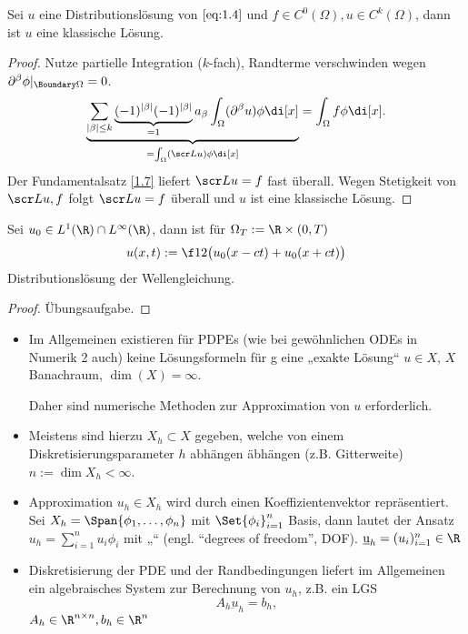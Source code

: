 \begin{st} \label{1.28}
	Sei $u$ eine Distributionslösung von $\eqref{eq:1.4}$ und $f \in C^0(\Omega), u \in C^k(\Omega)$, dann ist $u$ eine klassische Lösung.
	\begin{proof}
		Nutze partielle Integration ($k$-fach), Randterme verschwinden wegen $\partial^\beta \phi |_{\Boundary \Omega} = 0$.
		\[
			\underbrace{\sum_{|\beta|\le k} \underbrace{(-1)^{|\beta|} (-1)^{|\beta|}}_{=1} a_\beta \int_\Omega (\partial^\beta u) \phi \di[x]}_{= \int_\Omega (\scr L u) \phi \di[x]}
			= \int_\Omega f \phi \di[x].
		\]
		Der Fundamentalsatz \ref{1.7} liefert $\scr L u = f$ fast überall.
		Wegen Stetigkeit von $\scr L u, f$ folgt $\scr L u = f$ überall und $u$ ist eine klassische Lösung.
	\end{proof}
\end{st}

\begin{st} \label{1.29}
	Sei $u_0 \in L^1(\R) \cap L^\infty(\R)$, dann ist für $\Omega_T := \R \times (0,T)$
	\[
		u(x,t) := \f 12 \big( u_0(x-ct) + u_0(x+ct) \big)
	\]
	Distributionslösung der Wellengleichung.
	\begin{proof}
		Übungsaufgabe.
	\end{proof}
\end{st}

\begin{nt*}
	\begin{itemize}
		\item
			Im Allgemeinen existieren für PDPEs (wie bei gewöhnlichen ODEs in Numerik 2 auch) keine Lösungsformeln für g eine „exakte Lösung“ $u \in X$, $X$ Banachraum, $\dim(X) = \infty$.

			Daher sind numerische Methoden zur Approximation von $u$ erforderlich.
		\item
			Meistens sind hierzu  $X_h \subset X$ gegeben, welche von einem Diskretisierungsparameter $h$ abhängen äbhängen (z.B. Gitterweite) $n := \dim X_h < \infty$.
		\item
			Approximation $u_h \in X_h$ wird durch einen Koeffizientenvektor repräsentiert.
			Sei $X_h = \Span{\phi_1, \dotsc, \phi_n}$ mit $\Set{\phi_i}_{i=1}^n$ Basis, dann lautet der Ansatz $u_h = \sum_{i=1}^n u_i \phi_i$ mit „“ (engl. “degrees of freedom”, DOF).
			$\underbar{u}_h = (u_i)_{i=1}^n \in \R$
		\item
			Diskretisierung der PDE und der Randbedingungen liefert im Allgemeinen ein algebraisches System zur Berechnung von $u_h$, z.B. ein LGS
			\[
				A_h \underbar{u}_h = b_h,
			\]
			$A_h \in \R^{n\times n}, b_h \in \R^n$
	\end{itemize}
\end{nt*}

